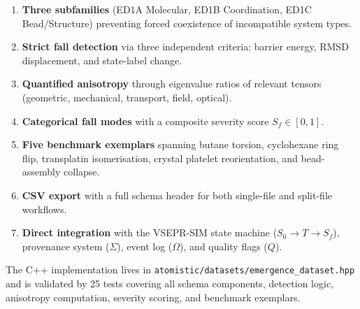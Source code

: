 \documentclass[11pt]{article}
\begin{document}
\begin{enumerate}
  \item \textbf{Three subfamilies} (ED1A Molecular, ED1B Coordination, ED1C Bead/Structure) preventing forced coexistence of incompatible system types.
  \item \textbf{Strict fall detection} via three independent criteria: barrier energy, RMSD displacement, and state-label change.
  \item \textbf{Quantified anisotropy} through eigenvalue ratios of relevant tensors (geometric, mechanical, transport, field, optical).
  \item \textbf{Categorical fall modes} with a composite severity score $S_f \in [0, 1]$.
  \item \textbf{Five benchmark exemplars} spanning butane torsion, cyclohexane ring flip, transplatin isomerisation, crystal platelet reorientation, and bead-assembly collapse.
  \item \textbf{CSV export} with a full schema header for both single-file and split-file workflows.
  \item \textbf{Direct integration} with the VSEPR-SIM state machine ($S_0 \to T \to S_f$), provenance system ($\Sigma$), event log ($\Omega$), and quality flags ($Q$).
\end{enumerate}

The C++ implementation lives in \texttt{atomistic/datasets/emergence\_dataset.hpp} and is validated by 25 tests covering all schema components, detection logic, anisotropy computation, severity scoring, and benchmark exemplars.
\end{document}
